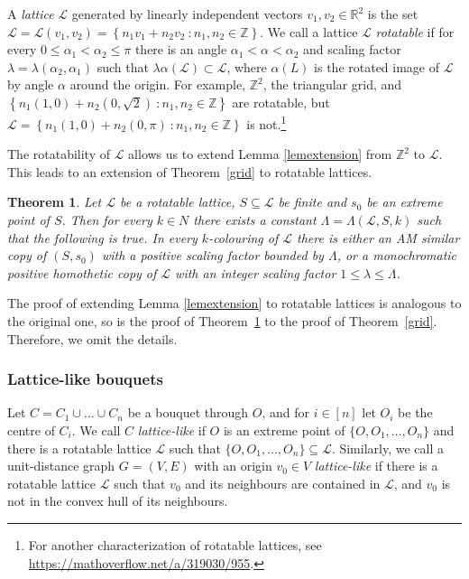 \documentclass[12pt]{article}
\newcommand{\setbuilder}[2]{\left\{#1\ \colon #2\right\}}
\newcommand{\Z}{{\mathbb Z}}
\renewcommand{\L}{{\mathcal L}}
\theoremstyle{plain}
\newtheorem{theorem}{Theorem}
\theoremstyle{definition}
\begin{document}
A \emph{lattice} $\L$ generated by linearly independent vectors $v_1,v_2\in \mathbb{R}^2$ is the set $\L=\L(v_1,v_2)=\setbuilder{n_1v_1+n_2v_2}{n_1,n_2\in \Z}$.
We call a lattice $\L$ \emph{rotatable} if for every $0\leq \alpha_1< \alpha_2\leq \pi$ there is an angle $\alpha_1<\alpha<\alpha_2$ and scaling factor $\lambda= \lambda(\alpha_2,\alpha_1)$ such that $\lambda\alpha(\L)\subset\L$, where $\alpha(L)$ is the rotated image of $\L$ by angle $\alpha$ around the origin.
For example, $\Z^2$, the triangular grid, and $\setbuilder{n_1(1,0)+n_2(0,\sqrt 2)}{n_1,n_2\in \Z}$ are rotatable, but $\L=\setbuilder{n_1(1,0)+n_2(0,\pi)}{n_1,n_2\in \Z}$ is not.\footnote{For another characterization of rotatable lattices, see \url{https://mathoverflow.net/a/319030/955}.} 

The rotatability of $\L$ allows us to extend Lemma \ref{lemextension} from $\mathbb{Z}^2$ to $\L$. This leads to an extension of Theorem~\ref{grid} to rotatable lattices.

\begin{theorem}\label{lattice}Let $\L$ be a rotatable lattice, $S\subseteq \L$ be finite and $s_0$ be an extreme point of $S$. Then for every $k\in N$ there exists a constant $\Lambda=\Lambda(\L,S,k)$ such that the following is true. In every $k$-colouring of $\L$ there is either an AM similar copy of $(S,s_0)$ with a positive scaling factor bounded by $\Lambda$, 
or a monochromatic positive homothetic copy of $\L$ with an integer scaling factor $1\leq \lambda \leq \Lambda$.
\end{theorem}

The proof of extending Lemma \ref{lemextension} to rotatable lattices is analogous to the original one, so is the proof of Theorem~\ref{lattice} to the proof of Theorem~\ref{grid}. Therefore, we omit the details.




\subsubsection{Lattice-like bouquets}

Let $C=C_1\cup\dots\cup C_n$ be a bouquet through $O$, and for $i\in [n]$ let $O_i$ be the centre of $C_i$. We call $C$ \emph{lattice-like} if $O$ is an extreme point of $\{O,O_1,\dots,O_n\}$ and there is a rotatable lattice $\L$ such that $\{O,O_1,\dots,O_n\}\subseteq \L$. Similarly, we call a unit-distance graph $G=(V,E)$ with an origin $v_0\in V$ \emph{lattice-like} if there is a rotatable lattice $\L$ such that $v_0$ and its neighbours are contained in $\L$, and $v_0$ is not in the convex hull of its neighbours.
\end{document}
